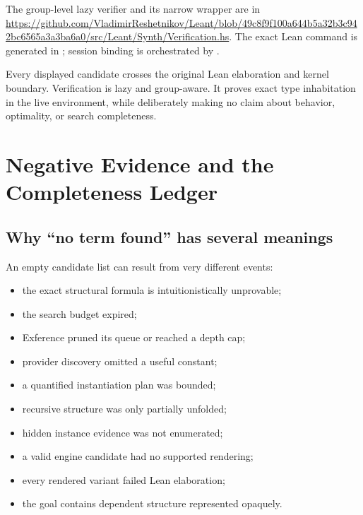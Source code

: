 \documentclass[10pt,letterpaper,oneside,openany]{report}
\newcommand{\term}[1]{\texttt{\detokenize{#1}}}
\begin{document}
\begin{sourcebox}
The group-level lazy verifier and its narrow \term{Verified} wrapper are in \url{https://github.com/VladimirReshetnikov/Leant/blob/49c8f9f100a644b5a32b3c942bc6565a3a3ba6a0/src/Leant/Synth/Verification.hs}.  The exact Lean command is generated in ; session binding is orchestrated by .
\end{sourcebox}

\begin{recapbox}
Every displayed candidate crosses the original Lean elaboration and kernel boundary.  Verification is lazy and group-aware.  It proves exact type inhabitation in the live environment, while deliberately making no claim about behavior, optimality, or search completeness.
\end{recapbox}

\chapter{Negative Evidence and the Completeness Ledger}\label{ch:negative}

\section{Why ``no term found'' has several meanings}

An empty candidate list can result from very different events:

\begin{itemize}
\item the exact structural formula is intuitionistically unprovable;
\item the search budget expired;
\item Exference pruned its queue or reached a depth cap;
\item provider discovery omitted a useful constant;
\item a quantified instantiation plan was bounded;
\item recursive structure was only partially unfolded;
\item hidden instance evidence was not enumerated;
\item a valid engine candidate had no supported rendering;
\item every rendered variant failed Lean elaboration;
\item the goal contains dependent structure represented opaquely.
\end{itemize}
\end{document}

